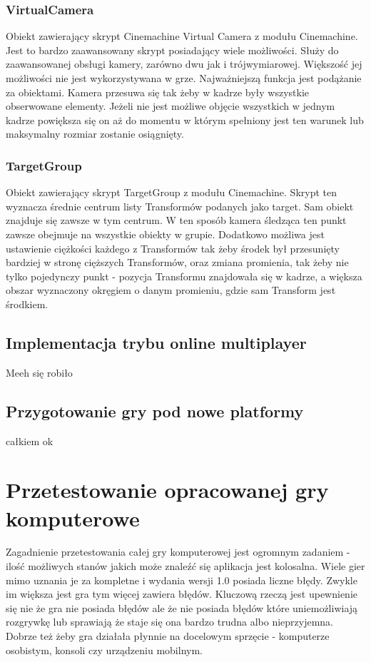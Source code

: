 \documentclass[a4paper,12pt,twoside,openany]{report}
\begin{document}
\subsection{VirtualCamera}
\label{virtualcamera}
Obiekt zawierający skrypt Cinemachine Virtual Camera z modułu Cinemachine. Jest to bardzo  zaawansowany skrypt posiadający wiele możliwości. Służy do zaawansowanej obsługi kamery, zarówno dwu jak i trójwymiarowej. Większość jej możliwości nie jest wykorzystywana w grze. Najważniejszą funkcja jest podążanie za obiektami. Kamera przesuwa się tak żeby w kadrze były wszystkie obserwowane elementy. Jeżeli nie jest możliwe objęcie wszystkich w jednym kadrze powiększa się on aż do momentu w którym spełniony jest ten warunek lub maksymalny rozmiar zostanie osiągnięty. 

\subsection{TargetGroup}
\label{targetgroup}
Obiekt zawierający skrypt TargetGroup z modułu Cinemachine. Skrypt ten wyznacza średnie centrum listy Transformów podanych jako target. Sam obiekt znajduje się zawsze w tym centrum. W ten sposób kamera śledząca ten punkt zawsze obejmuje na wszystkie obiekty w grupie. Dodatkowo możliwa jest ustawienie ciężkości każdego z Transformów tak żeby środek był przesunięty bardziej w stronę cięższych Transformów, oraz zmiana promienia, tak żeby nie tylko pojedynczy punkt - pozycja Transformu znajdowała się w kadrze, a większa obszar wyznaczony okręgiem o danym promieniu, gdzie sam Transform jest środkiem.

\section{Implementacja trybu online multiplayer}
\label{implementation_online}
Meeh się robiło

\section{Przygotowanie gry pod nowe platformy}

całkiem ok

\chapter{Przetestowanie opracowanej gry komputerowe}

Zagadnienie przetestowania całej gry komputerowej jest ogromnym zadaniem - ilość możliwych stanów jakich może znaleźć się aplikacja jest kolosalna. Wiele gier mimo uznania je za kompletne i wydania wersji 1.0 posiada liczne błędy. Zwykle im większa jest gra tym więcej zawiera błędów. Kluczową rzeczą jest upewnienie się nie że gra nie posiada błędów ale że nie posiada błędów które uniemożliwiają rozgrywkę lub sprawiają że staje się ona bardzo trudna albo nieprzyjemna. Dobrze też żeby gra działała płynnie na docelowym sprzęcie - komputerze osobistym, konsoli czy urządzeniu mobilnym. 
\end{document}
